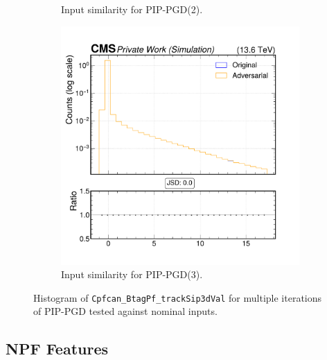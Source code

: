 \begin{figure}[h]
\begin{subfigure}[t]{0.32\textwidth}
    \caption*{Input similarity for PIP-PGD(2).}
  \end{subfigure}\hfill
  \begin{subfigure}[t]{0.32\textwidth}
    \includegraphics[width=\linewidth]{media/output/features/compare/combined_it_3/cmp_cpf_arr_Cpfcan_BtagPf_trackSip3dVal.pdf}
    \caption*{Input similarity for PIP-PGD(3).}
  \end{subfigure}

  \caption*{Histogram of \texttt{Cpfcan\_BtagPf\_trackSip3dVal} for multiple iterations of PIP-PGD tested against nominal inputs.}
  \label{fig:combined_input_Cpfcan_BtagPf_trackSip3dVal}
\end{figure}

\FloatBarrier
\newpage
\subsection*{NPF Features}


